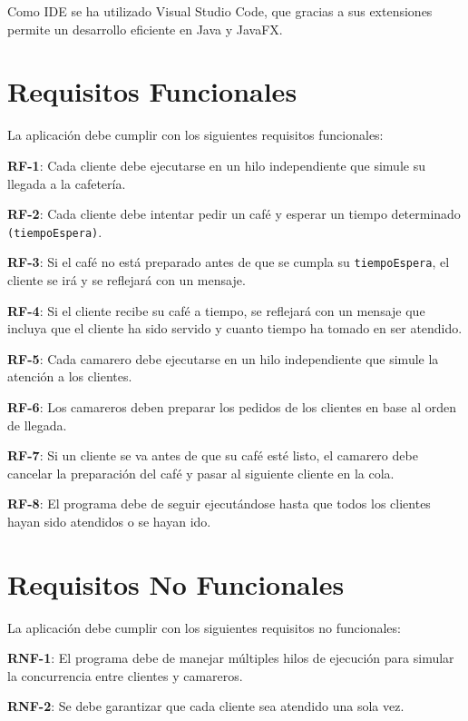 \documentclass[12pt]{article}
\begin{document}
\justify
Como IDE se ha utilizado Visual Studio Code, que gracias a sus extensiones permite un desarrollo eficiente en Java y JavaFX.

\newpage

\section{Requisitos Funcionales}

\justify
La aplicación debe cumplir con los siguientes requisitos funcionales:

\justify
\textbf{RF-1}: Cada cliente debe ejecutarse en un hilo independiente que simule su llegada a la cafetería.

\justify
\textbf{RF-2}: Cada cliente debe intentar pedir un café y esperar un tiempo determinado \texttt{(tiempoEspera)}.

\justify
\textbf{RF-3}: Si el café no está preparado antes de que se cumpla su \texttt{tiempoEspera}, el cliente se irá y se reflejará con un mensaje.

\justify
\textbf{RF-4}: Si el cliente recibe su café a tiempo, se reflejará con un mensaje que incluya que el cliente ha sido servido y cuanto tiempo ha tomado en ser atendido.

\justify
\textbf{RF-5}: Cada camarero debe ejecutarse en un hilo independiente que simule la atención a los clientes.

\justify
\textbf{RF-6}: Los camareros deben preparar los pedidos de los clientes en base al orden de llegada.

\justify
\textbf{RF-7}: Si un cliente se va antes de que su café esté listo, el camarero debe cancelar la preparación del café y pasar al siguiente cliente en la cola.

\justify
\textbf{RF-8}: El programa debe de seguir ejecutándose hasta que todos los clientes hayan sido atendidos o se hayan ido.

\section{Requisitos No Funcionales}

\justify
La aplicación debe cumplir con los siguientes requisitos no funcionales:

\justify
\textbf{RNF-1}: El programa debe de manejar múltiples hilos de ejecución para simular la concurrencia entre clientes y camareros.

\justify
\textbf{RNF-2}: Se debe garantizar que cada cliente sea atendido una sola vez.
\end{document}
